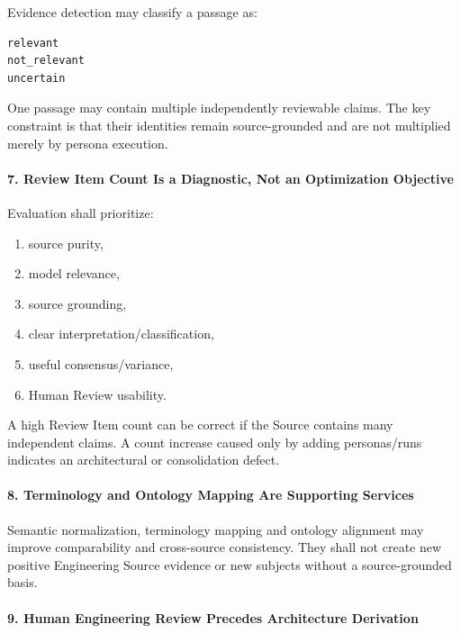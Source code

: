 Evidence detection may classify a passage as:

\begin{verbatim}
relevant
not_relevant
uncertain
\end{verbatim}

One passage may contain multiple independently reviewable claims. The key constraint is that their identities remain source-grounded and are not multiplied merely by persona execution.

\hypertarget{7-review-item-count-is-a-diagnostic-not-an-optimization-objective}{%
\paragraph{7. Review Item Count Is a Diagnostic, Not an Optimization Objective}\label{7-review-item-count-is-a-diagnostic-not-an-optimization-objective}}

Evaluation shall prioritize:

\begin{enumerate}
\def\labelenumi{\arabic{enumi}.}
\tightlist
\item
  source purity,
\item
  model relevance,
\item
  source grounding,
\item
  clear interpretation/classification,
\item
  useful consensus/variance,
\item
  Human Review usability.
\end{enumerate}

A high Review Item count can be correct if the Source contains many independent claims. A count increase caused only by adding personas/runs indicates an architectural or consolidation defect.

\hypertarget{8-terminology-and-ontology-mapping-are-supporting-services}{%
\paragraph{8. Terminology and Ontology Mapping Are Supporting Services}\label{8-terminology-and-ontology-mapping-are-supporting-services}}

Semantic normalization, terminology mapping and ontology alignment may improve comparability and cross-source consistency. They shall not create new positive Engineering Source evidence or new subjects without a source-grounded basis.

\hypertarget{9-human-engineering-review-precedes-architecture-derivation}{%
\paragraph{9. Human Engineering Review Precedes Architecture Derivation}\label{9-human-engineering-review-precedes-architecture-derivation}}

